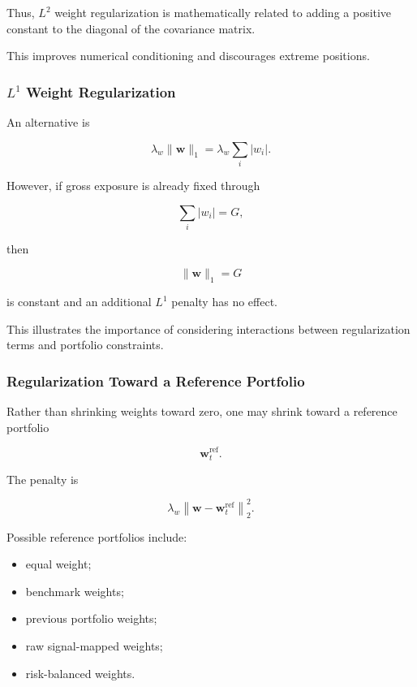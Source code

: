 \documentclass[11pt,a4paper]{article}
\begin{document}
Thus, $L^2$ weight regularization is mathematically related to adding a positive
constant to the diagonal of the covariance matrix.

This improves numerical conditioning and discourages extreme positions.


\subsubsection{$L^1$ Weight Regularization}

An alternative is

\begin{equation}
\boxed{
\lambda_w
\|\mathbf{w}\|_1
=
\lambda_w
\sum_i |w_i|.
}
\end{equation}

However, if gross exposure is already fixed through

\begin{equation}
\sum_i|w_i|
=
G,
\end{equation}

then

\begin{equation}
\|\mathbf{w}\|_1
=
G
\end{equation}

is constant and an additional $L^1$ penalty has no effect.

This illustrates the importance of considering interactions between
regularization terms and portfolio constraints.


\subsubsection{Regularization Toward a Reference Portfolio}

Rather than shrinking weights toward zero, one may shrink toward a reference
portfolio

\begin{equation}
\mathbf{w}_t^{\mathrm{ref}}.
\end{equation}

The penalty is

\begin{equation}
\boxed{
\lambda_w
\left\|
\mathbf{w}
-
\mathbf{w}_t^{\mathrm{ref}}
\right\|_2^2.
}
\end{equation}

Possible reference portfolios include:

\begin{itemize}
    \item equal weight;
    \item benchmark weights;
    \item previous portfolio weights;
    \item raw signal-mapped weights;
    \item risk-balanced weights.
\end{itemize}
\end{document}
